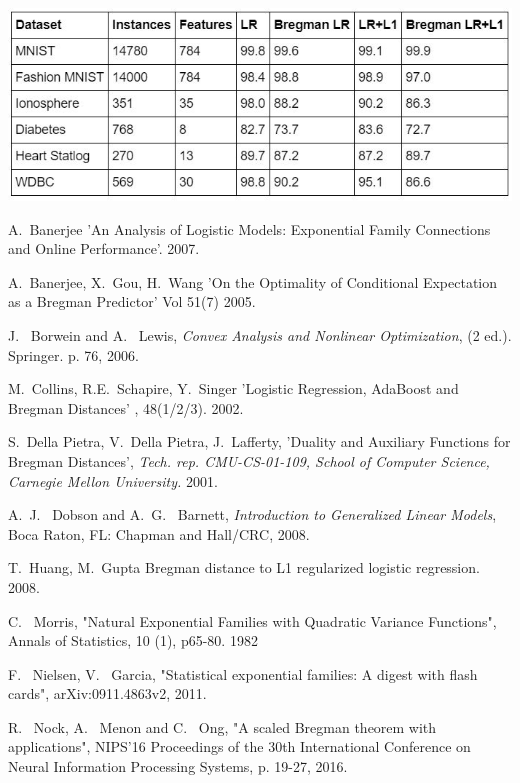 \documentclass[BSc]{usydthesis}
\numberwithin{equation}{chapter}
\theoremstyle{remark}
\begin{document}
\begin{center}
 \includegraphics[scale=0.8]{./results.jpg}
\end{center}


\begin{thebibliography}{10}

   {\sc  A.~Banerjee}
    \newblock 'An Analysis of Logistic Models:
Exponential Family Connections and Online Performance'.
    2007.  
    

    

    {\sc A.~Banerjee, X.~Gou, H.~Wang}
    \newblock  'On the Optimality of Conditional Expectation as a Bregman Predictor'
     Vol 51(7)
    2005.  
    
{\sc J.~ Borwein and A.~ Lewis}, {\em Convex Analysis and Nonlinear Optimization}, (2 ed.). Springer. p. 76, 2006.

   {\sc  M.~Collins, R.E.~Schapire, Y.~Singer}
    \newblock 'Logistic Regression, AdaBoost and Bregman Distances'
    , 48(1/2/3).
    2002.
    

    {\sc S.~Della Pietra, V.~Della Pietra, J.~Lafferty}, 'Duality and Auxiliary Functions for Bregman Distances', {\em Tech. rep. CMU-CS-01-109, School of Computer Science, Carnegie Mellon University.} 2001.
    
{\sc A.~J.~ Dobson and A.~G.~ Barnett}, {\em Introduction to Generalized Linear Models},  Boca Raton, FL: Chapman and Hall/CRC, 2008.


   {\sc  T.~Huang, M.~Gupta}
    \newblock Bregman distance to L1 regularized logistic regression.
    2008.  
    

{\sc C.~ Morris}, "Natural Exponential Families with Quadratic Variance Functions", Annals of Statistics,
10 (1), p65-80. 1982

{\sc F.~ Nielsen, V.~ Garcia}, "Statistical exponential families: A digest with flash cards", arXiv:0911.4863v2, 2011.

{\sc R.~ Nock, A.~ Menon and C.~ Ong}, "A scaled Bregman theorem with applications", NIPS'16 Proceedings of the 30th International Conference on Neural Information Processing Systems, p. 19-27, 2016. 




\end{thebibliography}
\end{document}

